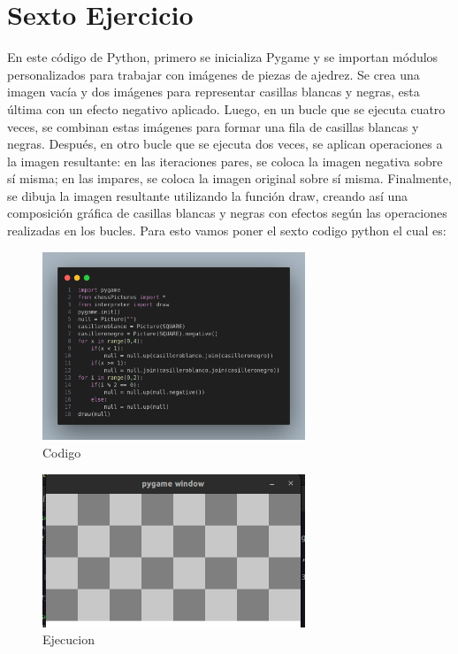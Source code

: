 \documentclass[10pt, a4paper]{article}
\begin{document}
\section{Sexto Ejercicio}
En este código de Python, primero se inicializa Pygame y se importan módulos personalizados para trabajar con imágenes de piezas de ajedrez. Se crea una imagen vacía y dos imágenes para representar casillas blancas y negras, esta última con un efecto negativo aplicado. Luego, en un bucle que se ejecuta cuatro veces, se combinan estas imágenes para formar una fila de casillas blancas y negras. Después, en otro bucle que se ejecuta dos veces, se aplican operaciones a la imagen resultante: en las iteraciones pares, se coloca la imagen negativa sobre sí misma; en las impares, se coloca la imagen original sobre sí misma. Finalmente, se dibuja la imagen resultante utilizando la función draw, creando así una composición gráfica de casillas blancas y negras con efectos según las operaciones realizadas en los bucles.
\singlespacing
Para esto vamos poner el sexto codigo python el cual es:  
\begin{figure}[H]
  \centering
  \includegraphics[width=0.7\textwidth]{img/Ej6.png}
  \caption{Codigo}
\end{figure}

\begin{figure}[H]
  \centering
  \includegraphics[width=0.7\textwidth]{img/Ejercicio6.png}
  \caption{Ejecucion}
\end{figure}
\end{document}
